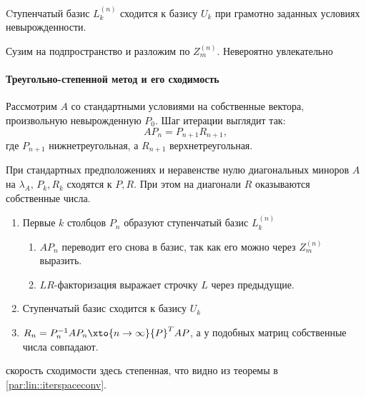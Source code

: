 \documentclass{trlnotes}
\begin{document}
\begin{thrm}\label{thrm:lin::iterspaceconv::stairbasis}
  Cтупенчатый базис $L_k^{(n)}$ сходится к базису $U_k$ при грамотно заданных
  условиях невырожденности.
\end{thrm}
\begin{prf}
  Сузим на подпространство и разложим по $Z_{m}^{(n)}$. Невероятно увлекательно
\end{prf}

\paragraph{Треугольно-степенной метод и его сходимость}
\label{par:lin::trpowermethod}

\begin{defn}\label{defn:lin::trpowermethod}
  Рассмотрим $A$ со стандартными условиями на собственные вектора, 
  произвольную невырожденную $P_0$.
  Шаг итерации выглядит так: 
  \[
    AP_{n} = P_{n+1}R_{n+1},
  \]где $P_{n+1}$ нижнетреугольная, а $R_{n+1}$ верхнетреугольная.
\end{defn}

\begin{thrm}\label{thrm:lin::trpowermethod::conv}
  При стандартных предположениях и неравенстве нулю диагональных
  миноров $A$ на $λ_A$, $P_k, R_k$ сходятся к $P, R$.
  При этом на диагонали $R$ оказываются собственные числа.
\end{thrm}

\begin{prf}
  \begin{enumerate}
    \item Первые $k$ столбцов $P_n$ образуют ступенчатый базис $L_k^{(n)}$
      \begin{enumerate}
        \item $AP_n$ переводит его снова в базис, так как его можно через $Z_{m}^{(n)}$
          выразить.
        \item $LR$-факторизация выражает строчку $L$ через предыдущие.
      \end{enumerate}
    \item Ступенчатый базис сходится к базису $U_k$
    \item $R_{n} = P_{n}^{-1}AP_n \xto{n\to\infty} {P}^T A P$, а у подобных матриц
      собственные числа совпадают.
  \end{enumerate}
\end{prf}
скорость сходимости здесь степенная, что видно из теоремы в
\ref{par:lin::iterspaceconv}.
\end{document}
